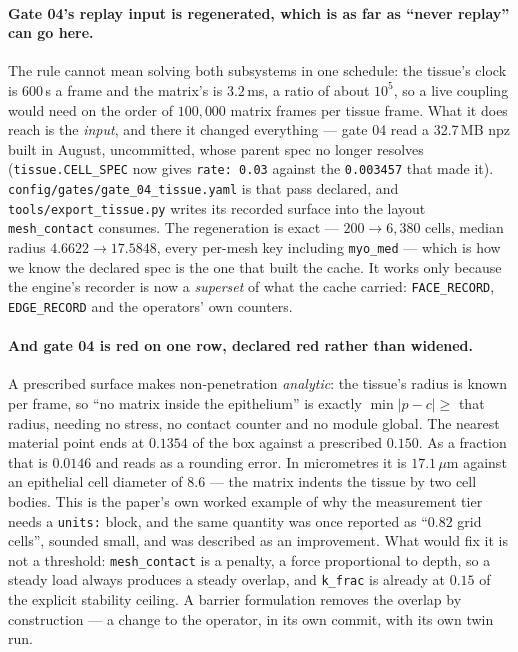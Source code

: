 \documentclass[11pt,a4paper]{article}
\newcommand{\code}[1]{\texttt{\small #1}}
\begin{document}
\paragraph{Gate 04's replay input is regenerated, which is as far as ``never replay'' can go here.}
The rule cannot mean solving both subsystems in one schedule: the tissue's clock is $600$\,s a frame
and the matrix's is $3.2$\,ms, a ratio of about $10^5$, so a live coupling would need on the order of
$100{,}000$ matrix frames per tissue frame. What it does reach is the \emph{input}, and there it
changed everything --- gate 04 read a 32.7\,MB npz built in August, uncommitted, whose parent spec no
longer resolves (\code{tissue.CELL\_SPEC} now gives \code{rate: 0.03} against the \code{0.003457}
that made it). \code{config/gates/gate\_04\_tissue.yaml} is that pass declared, and
\code{tools/export\_tissue.py} writes its recorded surface into the layout \code{mesh\_contact}
consumes. The regeneration is exact --- $200 \to 6{,}380$ cells, median radius
$4.6622 \to 17.5848$, every per-mesh key including \code{myo\_med} --- which is how we know the
declared spec is the one that built the cache. It works only because the engine's recorder is now a
\emph{superset} of what the cache carried: \code{FACE\_RECORD}, \code{EDGE\_RECORD} and the
operators' own counters.

\paragraph{And gate 04 is red on one row, declared red rather than widened.} A prescribed surface
makes non-penetration \emph{analytic}: the tissue's radius is known per frame, so ``no matrix inside
the epithelium'' is exactly $\min |p - c| \ge$ that radius, needing no stress, no contact counter and
no module global. The nearest material point ends at $0.1354$ of the box against a prescribed
$0.150$. As a fraction that is $0.0146$ and reads as a rounding error. In micrometres it is
$17.1\,\mu$m against an epithelial cell diameter of $8.6$ --- the matrix indents the tissue by two
cell bodies. This is the paper's own worked example of why the measurement tier needs a
\code{units:} block, and the same quantity was once reported as ``$0.82$ grid cells'', sounded small,
and was described as an improvement. What would fix it is not a threshold: \code{mesh\_contact} is a
penalty, a force proportional to depth, so a steady load always produces a steady overlap, and
\code{k\_frac} is already at $0.15$ of the explicit stability ceiling. A barrier formulation removes
the overlap by construction --- a change to the operator, in its own commit, with its own twin run.
\end{document}

